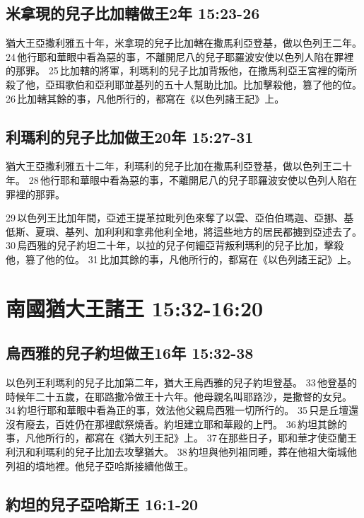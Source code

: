 \subsection{米拿現的兒子比加轄做王2年 15:23-26 }
猶大王亞撒利雅五十年，米拿現的兒子比加轄在撒馬利亞登基，做以色列王二年。 24 他行耶和華眼中看為惡的事，不離開尼八的兒子耶羅波安使以色列人陷在罪裡的那罪。 25 比加轄的將軍，利瑪利的兒子比加背叛他，在撒馬利亞王宮裡的衛所殺了他，亞珥歌伯和亞利耶並基列的五十人幫助比加。比加擊殺他，篡了他的位。 26 比加轄其餘的事，凡他所行的，都寫在《以色列諸王記》上。

\subsection{利瑪利的兒子比加做王20年 15:27-31 }
猶大王亞撒利雅五十二年，利瑪利的兒子比加在撒馬利亞登基，做以色列王二十年。 28 他行耶和華眼中看為惡的事，不離開尼八的兒子耶羅波安使以色列人陷在罪裡的那罪。

29 以色列王比加年間，亞述王提革拉毗列色來奪了以雲、亞伯伯瑪迦、亞挪、基低斯、夏瑣、基列、加利利和拿弗他利全地，將這些地方的居民都擄到亞述去了。 30 烏西雅的兒子約坦二十年，以拉的兒子何細亞背叛利瑪利的兒子比加，擊殺他，篡了他的位。 31 比加其餘的事，凡他所行的，都寫在《以色列諸王記》上。

\section{南國猶大王諸王 15:32-16:20 }
\subsection{烏西雅的兒子約坦做王16年 15:32-38 }
以色列王利瑪利的兒子比加第二年，猶大王烏西雅的兒子約坦登基。 33 他登基的時候年二十五歲，在耶路撒冷做王十六年。他母親名叫耶路沙，是撒督的女兒。 34 約坦行耶和華眼中看為正的事，效法他父親烏西雅一切所行的。 35 只是丘壇還沒有廢去，百姓仍在那裡獻祭燒香。約坦建立耶和華殿的上門。 36 約坦其餘的事，凡他所行的，都寫在《猶大列王記》上。 37 在那些日子，耶和華才使亞蘭王利汛和利瑪利的兒子比加去攻擊猶大。 38 約坦與他列祖同睡，葬在他祖大衛城他列祖的墳地裡。他兒子亞哈斯接續他做王。

\subsection{約坦的兒子亞哈斯王 16:1-20 }
